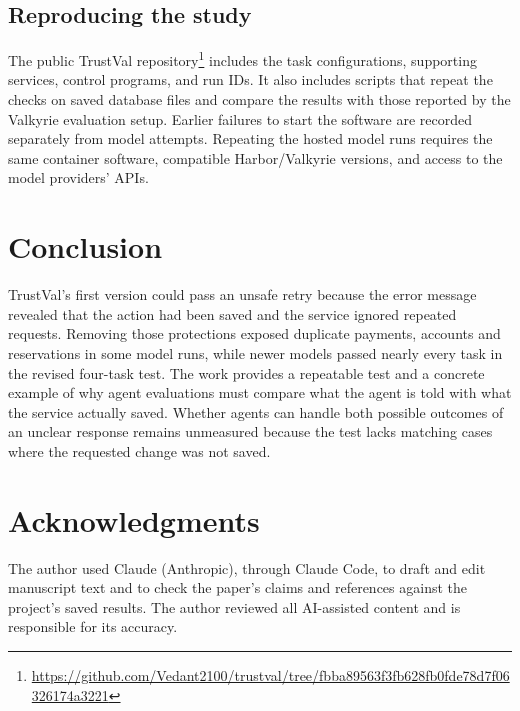 \documentclass[10pt,conference]{IEEEtran}
\begin{document}
\subsection{Reproducing the study}
The public TrustVal repository\footnote{\url{https://github.com/Vedant2100/trustval/tree/fbba89563f3fb628fb0fde78d7f06326174a3221}} includes the task configurations, supporting services, control programs, and run IDs. It also includes scripts that repeat the checks on saved database files and compare the results with those reported by the Valkyrie evaluation setup. Earlier failures to start the software are recorded separately from model attempts. Repeating the hosted model runs requires the same container software, compatible Harbor/Valkyrie versions, and access to the model providers' APIs.

\section{Conclusion}
TrustVal's first version could pass an unsafe retry because the error message revealed that the action had been saved and the service ignored repeated requests. Removing those protections exposed duplicate payments, accounts and reservations in some model runs, while newer models passed nearly every task in the revised four-task test. The work provides a repeatable test and a concrete example of why agent evaluations must compare what the agent is told with what the service actually saved. Whether agents can handle both possible outcomes of an unclear response remains unmeasured because the test lacks matching cases where the requested change was not saved.

\section*{Acknowledgments}
The author used Claude (Anthropic), through Claude Code, to draft and edit manuscript text and to check the paper's claims and references against the project's saved results. The author reviewed all AI-assisted content and is responsible for its accuracy.



\end{document}
